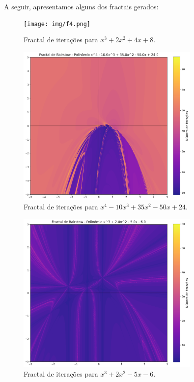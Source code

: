 \documentclass[12pt]{article}
\begin{document}
A seguir, apresentamos alguns dos fractais gerados:

\begin{figure}[H]
\centering
\texttt{[image: img/f4.png]}
\caption{Fractal de iterações para $x^3 + 2x^2 + 4x + 8$.}
\end{figure}

\begin{figure}[H]
\centering
\includegraphics[width=0.8\textwidth]{img/f6.png}
\caption{Fractal de iterações para $x^4 - 10x^3 + 35x^2 - 50x + 24$.}
\end{figure}

\begin{figure}[H]
\centering
\includegraphics[width=0.8\textwidth]{img/f7.png}
\caption{Fractal de iterações para $x^3 + 2x^2 - 5x - 6$.}
\end{figure}
\end{document}
